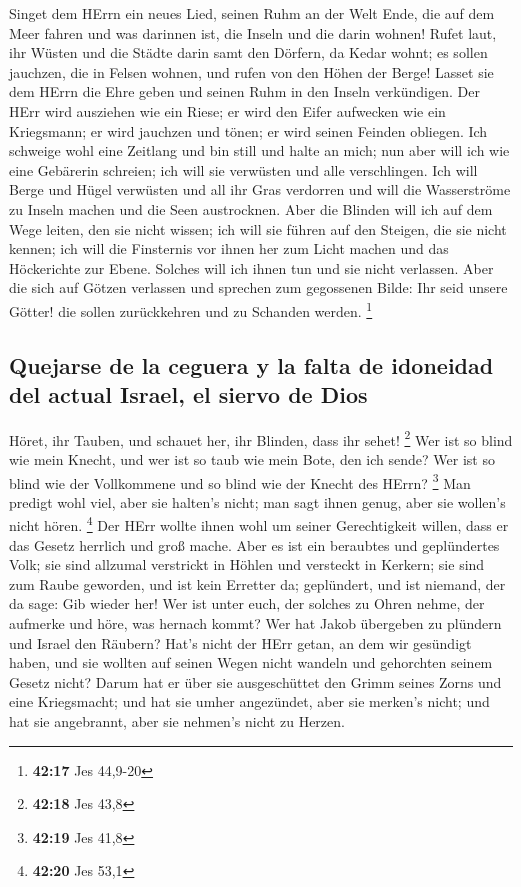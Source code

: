  Singet dem HErrn ein neues Lied, seinen Ruhm an der Welt
Ende, die auf dem Meer fahren und was darinnen ist, die Inseln und die
darin wohnen!  Rufet laut, ihr Wüsten und die Städte
darin samt den Dörfern, da Kedar wohnt; es sollen jauchzen, die in
Felsen wohnen, und rufen von den Höhen der Berge!  Lasset
sie dem HErrn die Ehre geben und seinen Ruhm in den Inseln verkündigen.
 Der HErr wird ausziehen wie ein Riese; er wird den Eifer
aufwecken wie ein Kriegsmann; er wird jauchzen und tönen; er wird seinen
Feinden obliegen.  Ich schweige wohl eine Zeitlang und
bin still und halte an mich; nun aber will ich wie eine Gebärerin
schreien; ich will sie verwüsten und alle verschlingen. 
Ich will Berge und Hügel verwüsten und all ihr Gras verdorren und will
die Wasserströme zu Inseln machen und die Seen austrocknen.
 Aber die Blinden will ich auf dem Wege leiten, den sie
nicht wissen; ich will sie führen auf den Steigen, die sie nicht kennen;
ich will die Finsternis vor ihnen her zum Licht machen und das
Höckerichte zur Ebene. Solches will ich ihnen tun und sie nicht
verlassen.  Aber die sich auf Götzen verlassen und
sprechen zum gegossenen Bilde: Ihr seid unsere Götter! die sollen
zurückkehren und zu Schanden werden. \footnote{\textbf{42:17} Jes
  44,9-20}

\hypertarget{quejarse-de-la-ceguera-y-la-falta-de-idoneidad-del-actual-israel-el-siervo-de-dios}{%
\subsection{Quejarse de la ceguera y la falta de idoneidad del actual
Israel, el siervo de
Dios}\label{quejarse-de-la-ceguera-y-la-falta-de-idoneidad-del-actual-israel-el-siervo-de-dios}}

 Höret, ihr Tauben, und schauet her, ihr Blinden, dass
ihr sehet! \footnote{\textbf{42:18} Jes 43,8}  Wer ist so
blind wie mein Knecht, und wer ist so taub wie mein Bote, den ich sende?
Wer ist so blind wie der Vollkommene und so blind wie der Knecht des
HErrn? \footnote{\textbf{42:19} Jes 41,8}  Man predigt
wohl viel, aber sie halten's nicht; man sagt ihnen genug, aber sie
wollen's nicht hören. \footnote{\textbf{42:20} Jes 53,1} 
Der HErr wollte ihnen wohl um seiner Gerechtigkeit willen, dass er das
Gesetz herrlich und groß mache.  Aber es ist ein
beraubtes und geplündertes Volk; sie sind allzumal verstrickt in Höhlen
und versteckt in Kerkern; sie sind zum Raube geworden, und ist kein
Erretter da; geplündert, und ist niemand, der da sage: Gib wieder her!
 Wer ist unter euch, der solches zu Ohren nehme, der
aufmerke und höre, was hernach kommt?  Wer hat Jakob
übergeben zu plündern und Israel den Räubern? Hat's nicht der HErr
getan, an dem wir gesündigt haben, und sie wollten auf seinen Wegen
nicht wandeln und gehorchten seinem Gesetz nicht?  Darum
hat er über sie ausgeschüttet den Grimm seines Zorns und eine
Kriegsmacht; und hat sie umher angezündet, aber sie merken's nicht; und
hat sie angebrannt, aber sie nehmen's nicht zu Herzen.

